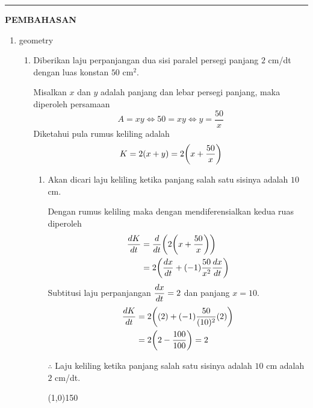 \vspace{0.2cm}
\hrule height 1pt
\vspace{0.5cm}
\begin{center}
    \textbf{\large{PEMBAHASAN}}
\end{center}
\begin{enumerate}[leftmargin=*, label={\arabic*}.]
\item geometry
\begin{enumerate}[label={\alph*}.]
    \item Diberikan laju perpanjangan dua sisi paralel persegi panjang $2$ cm/dt dengan 
    luas konstan $50$ cm$^{2}$.

    Misalkan $x$ dan $y$ adalah panjang dan lebar persegi panjang, maka diperoleh persamaan
    \[
    A = xy \iff 50 = xy \iff y = \frac{50}{x}
    \]
    Diketahui pula rumus keliling adalah
    \[
    K = 2(x+y) = 2\bracket*{x+\frac{50}{x}}
    \]
    \begin{enumerate}[label={\roman*}.]
        \item Akan dicari laju keliling ketika panjang salah satu sisinya adalah $10$ cm.
        
        Dengan rumus keliling maka dengan mendiferensialkan kedua ruas diperoleh
        \begin{align*}
            \frac{dK}{dt} &= \drv{t}{2\bracket*{x+\frac{50}{x}}}\\
            &=2\bracket*{\frac{dx}{dt}+(-1)\frac{50}{x^{2}}\frac{dx}{dt}}\\
        \end{align*}
        Subtitusi laju perpanjangan $\displaystyle \frac{dx}{dt} = 2$ dan panjang $x=10$.
        \begin{align*}
            \frac{dK}{dt} &=2\bracket*{(2)+(-1)\frac{50}{(10)^{2}}(2)}\\
            &=2\bracket*{2-\frac{100}{100}} = 2
        \end{align*}

        $\therefore$ Laju keliling ketika panjang salah satu sisinya adalah $10$ cm adalah
        $2$ cm/dt.
\begin{center}
    \line(1,0){150}
\end{center}


\end{enumerate}
\end{enumerate}
\end{enumerate}
